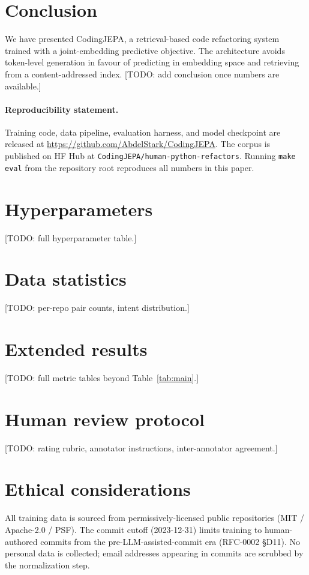 \documentclass[10pt]{article}
\begin{document}
\section{Conclusion}
\label{sec:conclusion}

We have presented CodingJEPA, a retrieval-based code refactoring system trained with a
joint-embedding predictive objective. The architecture avoids token-level generation in favour
of predicting in embedding space and retrieving from a content-addressed index. [TODO: add
conclusion once numbers are available.]

\paragraph{Reproducibility statement.}
Training code, data pipeline, evaluation harness, and model checkpoint are released at
\url{https://github.com/AbdelStark/CodingJEPA}. The corpus is published on HF Hub at
\texttt{CodingJEPA/human-python-refactors}. Running \texttt{make eval} from the repository
root reproduces all numbers in this paper.

\appendix

\section{Hyperparameters}
\label{app:hparams}

[TODO: full hyperparameter table.]

\section{Data statistics}
\label{app:data}

[TODO: per-repo pair counts, intent distribution.]

\section{Extended results}
\label{app:results}

[TODO: full metric tables beyond Table~\ref{tab:main}.]

\section{Human review protocol}
\label{app:human}

[TODO: rating rubric, annotator instructions, inter-annotator agreement.]

\section{Ethical considerations}
\label{app:ethics}

All training data is sourced from permissively-licensed public repositories
(MIT / Apache-2.0 / PSF). The commit cutoff (2023-12-31) limits training to
human-authored commits from the pre-LLM-assisted-commit era (RFC-0002 §D11).
No personal data is collected; email addresses appearing in commits are scrubbed
by the normalization step.



\end{document}
